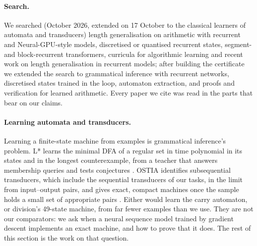 \documentclass[11pt]{article}
\begin{document}
\paragraph{Search.} We searched (October 2026, extended on 17 October to the classical learners of
automata and transducers) length generalisation on arithmetic with recurrent
and Neural-GPU-style models, discretised or quantised recurrent states, segment- and
block-recurrent transformers, curricula for algorithmic learning and recent work on length
generalisation in recurrent models; after building the certificate we extended the search to
grammatical inference with recurrent networks, discretised states trained in the loop, automaton
extraction, and proofs and verification for learned arithmetic. Every paper we cite was read in the
parts that bear on our claims.

\paragraph{Learning automata and transducers.} Learning a finite-state machine from examples is
grammatical inference's problem. L* learns the minimal DFA of a regular set in time polynomial in its
states and in the longest counterexample, from a teacher that answers membership queries and tests
conjectures \citep{angluin-1987-learning-regular-sets-queries-counterexamples}. OSTIA identifies
subsequential transducers, which include the sequential transducers of our tasks, in the limit from
input--output pairs, and gives exact, compact machines once the sample holds a small set of
appropriate pairs \citep{oncina-1992-transducer-learning-pattern-recognition}. Either would learn
the carry automaton, or division's 49-state machine, from far fewer examples than we use. They are
not our comparators: we ask when a neural sequence model trained by gradient descent implements an
exact machine, and how to prove that it does. The rest of this section is the work on that
question.
\end{document}
